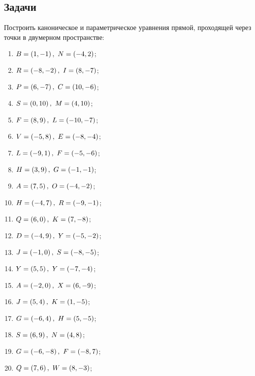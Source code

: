 \subsection{Задачи}

	Построить каноническое и параметрическое уравнения прямой, проходящей через точки в двумерном пространстве:
	\begin{multicols}{2}
		\begin{enumerate}
			\setcounter{enumi}{\value{tasks}}
				
				\item \( \displaystyle B = \left( 1, -1 \right), ~ N = \left( -4, 2 \right) \);
				\item \( \displaystyle R = \left( -8, -2 \right), ~ I = \left( 8, -7 \right) \);
				\item \( \displaystyle P = \left( 6, -7 \right), ~ C = \left( 10, -6 \right) \);
				\item \( \displaystyle S = \left( 0, 10 \right), ~ M = \left( 4, 10 \right) \);
				\item \( \displaystyle F = \left( 8, 9 \right), ~ L = \left( -10, -7 \right) \);
				\item \( \displaystyle V = \left( -5, 8 \right), ~ E = \left( -8, -4 \right) \);
				\item \( \displaystyle L = \left( -9, 1 \right), ~ F = \left( -5, -6 \right) \);
				\item \( \displaystyle H = \left( 3, 9 \right), ~ G = \left( -1, -1 \right) \);
				\item \( \displaystyle A = \left( 7, 5 \right), ~ O = \left( -4, -2 \right) \);
				\item \( \displaystyle H = \left( -4, 7 \right), ~ R = \left( -9, -1 \right) \);
				\item \( \displaystyle Q = \left( 6, 0 \right), ~ K = \left( 7, -8 \right) \);
				\item \( \displaystyle D = \left( -4, 9 \right), ~ Y = \left( -5, -2 \right) \);
				\item \( \displaystyle J = \left( -1, 0 \right), ~ S = \left( -8, -5 \right) \);
				\item \( \displaystyle Y = \left( 5, 5 \right), ~ Y = \left( -7, -4 \right) \);
				\item \( \displaystyle A = \left( -2, 0 \right), ~ X = \left( 6, -9 \right) \);
				\item \( \displaystyle J = \left( 5, 4 \right), ~ K = \left( 1, -5 \right) \);
				\item \( \displaystyle G = \left( -6, 4 \right), ~ H = \left( 5, -5 \right) \);
				\item \( \displaystyle S = \left( 6, 9 \right), ~ N = \left( 4, 8 \right) \);
				\item \( \displaystyle G = \left( -6, -8 \right), ~ F = \left( -8, 7 \right) \);
				\item \( \displaystyle Q = \left( 7, 6 \right), ~ W = \left( 8, -3 \right) \);

			\setcounter{tasks}{\value{enumi}}
		\end{enumerate}
	\end{multicols}


